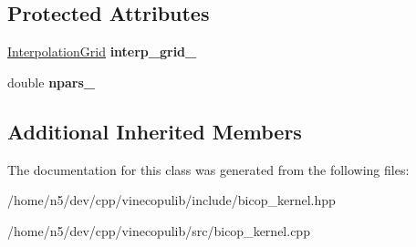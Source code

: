 \subsection*{Protected Attributes}
\begin{DoxyCompactItemize}
\item 
\hyperlink{class_interpolation_grid}{Interpolation\+Grid} {\bfseries interp\+\_\+grid\+\_\+}\hypertarget{class_kernel_bicop_a38c072985270dd91e2424d4453ee94a0}{}\label{class_kernel_bicop_a38c072985270dd91e2424d4453ee94a0}

\item 
double {\bfseries npars\+\_\+}\hypertarget{class_kernel_bicop_aab4f58d0b48ffba37fc617ba7ea9de56}{}\label{class_kernel_bicop_aab4f58d0b48ffba37fc617ba7ea9de56}

\end{DoxyCompactItemize}
\subsection*{Additional Inherited Members}


The documentation for this class was generated from the following files\+:\begin{DoxyCompactItemize}
\item 
/home/n5/dev/cpp/vinecopulib/include/bicop\+\_\+kernel.\+hpp\item 
/home/n5/dev/cpp/vinecopulib/src/bicop\+\_\+kernel.\+cpp\end{DoxyCompactItemize}
